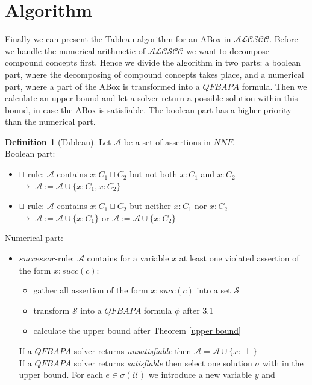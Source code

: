 \documentclass{book}
\theoremstyle{break}
\theoremstyle{definition}
\newtheorem{mydef}{Definition}
\begin{document}
\section{Algorithm}\label{Tableau}
Finally we can present the Tableau-algorithm for an ABox in $\mathcal{ALCSCC}$. Before we handle the numerical arithmetic of $\mathcal{ALCSCC}$ we want to decompose compound concepts first. Hence we divide the algorithm in two parts: a boolean part, where the decomposing of compound concepts takes place, and a numerical part, where a part of the ABox is transformed into a $QFBAPA$ formula. Then we calculate an upper bound and let a solver return a possible solution within this bound, in case the ABox is satisfiable. The boolean part has a higher priority than the numerical part. 
\begin{mydef}[Tableau]
Let $\mathcal{A}$ be a set of assertions in $NNF$.\\
Boolean part:
\begin{itemize}
\item\label{cap} $\sqcap$-rule: $\mathcal{A}$ contains $x:C_1\sqcap C_2$ but not both $x:C_1$ and $x:C_2$\\
$\rightarrow$ $\mathcal{A}:=\mathcal{A}\cup\{x:C_1, x:C_2\}$
\item\label{cup} $\sqcup$-rule: $\mathcal{A}$ contains $x:C_1\sqcup C_2$ but neither $x:C_1$ nor $x:C_2$\\
$\rightarrow$ $\mathcal{A}:=\mathcal{A}\cup\{x:C_1\}$ or $\mathcal{A}:=\mathcal{A}\cup\{x:C_2\}$
\end{itemize}
Numerical part:
\begin{itemize}
\item\label{succ} $successor$-rule: $\mathcal{A}$ contains for a variable $x$ at least one violated assertion of the form $x:succ(c)$:
\begin{itemize}
\item gather all assertion of the form $x:succ(c)$ into a set $\mathcal{S}$
\item transform $\mathcal{S}$ into a $QFBAPA$ formula $\phi$ after 3.1
\item calculate the upper bound after Theorem \ref{upper bound}
\end{itemize}
If a $QFBAPA$ solver returns \textit{unsatisfiable} then $\mathcal{A}=\mathcal{A}\cup\{x:\perp\}$\\
If a $QFBAPA$ solver returns \textit{satisfiable} then select one solution $\sigma$ with in the upper bound. For each $e\in\sigma(\mathcal{U})$ we introduce a new variable $y$ and

\end{itemize}
\end{mydef}
\end{document}
